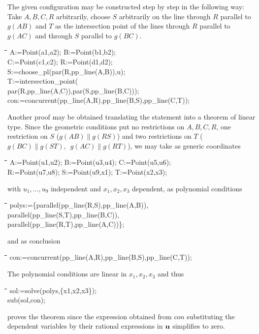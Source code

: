 \documentclass{article}
\newenvironment{code}{\tt \begin{tabbing}
\hspace*{1cm}\=\hspace*{1cm}\=\hspace*{1cm}\=
\hspace*{1cm}\=\hspace*{1cm}\=\kill
}{\end{tabbing}}
\newcommand{\uhh}{{\bf u}}
\begin{document}
The given configuration may be constructed step by step in the
following way: Take $A,B,C,R$ arbitrarily, choose $S$ arbitrarily on
the line through $R$ parallel to $g(AB)$ and $T$ as the intersection
point of the lines through $R$ parallel to $g(AC)$ and through $S$
parallel to $g(BC)$.
\begin{code}\>\+
A:=Point(a1,a2); B:=Point(b1,b2);\\ 
C:=Point(c1,c2); R:=Point(d1,d2);\\
S:=choose\_pl(par(R,pp\_line(A,B)),u);\\
T:=intersection\_point(\\\>\>
	par(R,pp\_line(A,C)),par(S,pp\_line(B,C)));\\[6pt]

con:=concurrent(pp\_line(A,R),pp\_line(B,S),pp\_line(C,T));
\end{code}
Another proof may be obtained translating the statement into a theorem
of linear type. Since the geometric conditions put no restrictions on
$A,B,C,R$, one restriction on $S$ ($g(AB)\|g(RS)$) and two
restrictions on $T$ ($g(BC)\|g(ST),\,$ $g(AC)\|g(RT)$),
we may take as generic coordinates
\begin{code}\>\+
A:=Point(u1,u2); B:=Point(u3,u4); C:=Point(u5,u6);\\
R:=Point(u7,u8); S:=Point(u9,x1); T:=Point(x2,x3);
\end{code}
with $u_1,\ldots,u_9$ independent and $x_1,x_2,x_3$ dependent, as
polynomial conditions
\begin{code}\+\+
polys:=\{\>\>parallel(pp\_line(R,S),pp\_line(A,B)),\\
	parallel(pp\_line(S,T),pp\_line(B,C)),\\
	parallel(pp\_line(R,T),pp\_line(A,C))\};
\end{code}
and as conclusion
\begin{code}\>
con:=concurrent(pp\_line(A,R),pp\_line(B,S),pp\_line(C,T));
\end{code}
The polynomial conditions are linear in $x_1,x_2,x_3$ and thus 
\begin{code}\>\+
sol:=solve(polys,\{x1,x2,x3\});\\
sub(sol,con);
\end{code}
proves the theorem since the expression obtained from $con$
substituting the dependent variables by their rational expressions in
$\uhh$ simplifies to zero.
\medskip
\end{document}
